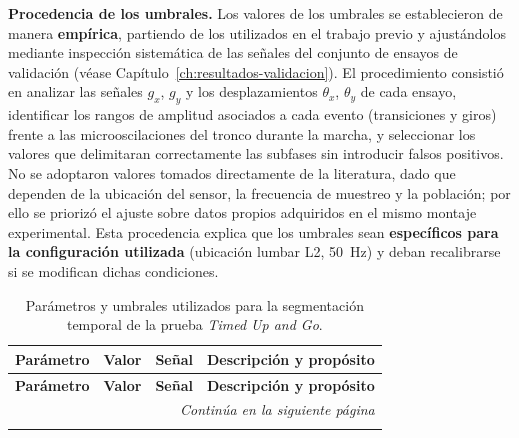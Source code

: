 \documentclass[12pt]{report}
\begin{document}
\begin{justify}
    \textbf{Procedencia de los umbrales.} Los valores de los umbrales se establecieron de manera \textbf{empírica}, partiendo de los utilizados en el trabajo previo \cite{Sistema-portable-TUG-AKuleshov} y ajustándolos mediante inspección sistemática de las señales del conjunto de ensayos de validación (véase Capítulo~\ref{ch:resultados-validacion}). El procedimiento consistió en analizar las señales $g_x$, $g_y$ y los desplazamientos $\theta_x$, $\theta_y$ de cada ensayo, identificar los rangos de amplitud asociados a cada evento (transiciones y giros) frente a las microoscilaciones del tronco durante la marcha, y seleccionar los valores que delimitaran correctamente las subfases sin introducir falsos positivos.\\

    No se adoptaron valores tomados directamente de la literatura, dado que dependen de la ubicación del sensor, la frecuencia de muestreo y la población; por ello se priorizó el ajuste sobre datos propios adquiridos en el mismo montaje experimental. Esta procedencia explica que los umbrales sean \textbf{específicos para la configuración utilizada} (ubicación lumbar L2, 50~Hz) y deban recalibrarse si se modifican dichas condiciones.

    \begin{longtable}{|c|c|c|p{7.2cm}|}
        \caption{Parámetros y umbrales utilizados para la segmentación temporal de la prueba \textit{Timed Up and Go}.}
        \label{tab:umbrales-segmentacion-tug}                                                                                                                         \\

        \hline
        \textbf{Parámetro}           & \textbf{Valor}             & \textbf{Señal}      & \textbf{Descripción y propósito}                                            \\
        \hline
        \endfirsthead

        \hline
        \textbf{Parámetro}           & \textbf{Valor}             & \textbf{Señal}      & \textbf{Descripción y propósito}                                            \\
        \hline
        \endhead

        \hline
        \multicolumn{4}{r}{\textit{Continúa en la siguiente página}}                                                                                                  \\
        \endfoot


\end{longtable}
\end{justify}
\end{document}

